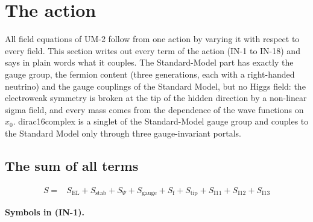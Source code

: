 \documentclass[
  10pt,
]{article}
\begin{document}
\hypertarget{the-action}{%
\section{The action}\label{the-action}}

All field equations of UM-2 follow from one action by varying it with
respect to every field. This section writes out every term of the action
(IN-1 to IN-18) and says in plain words what it couples. The
Standard-Model part has exactly the gauge group, the fermion content
(three generations, each with a right-handed neutrino) and the gauge
couplings of the Standard Model, but no Higgs field: the electroweak
symmetry is broken at the tip of the hidden direction by a non-linear
sigma field, and every mass comes from the dependence of the wave
functions on \(x_0\). dirac16complex is a singlet of the Standard-Model
gauge group and couples to the Standard Model only through three
gauge-invariant portals.

\hypertarget{the-sum-of-all-terms}{%
\subsection{The sum of all terms}\label{the-sum-of-all-terms}}

\[
\begin{aligned}
S ={}& S_{\mathrm{EL}} + S_{\mathrm{stab}} + S_\Psi + S_{\mathrm{gauge}} + S_{\mathrm{f}} + S_{\mathrm{tip}}
 + S_{\mathrm{I11}} + S_{\mathrm{I12}} + S_{\mathrm{I13}}
\end{aligned} \tag{IN-1}
\]

\textbf{Symbols in (IN-1).}
\end{document}
